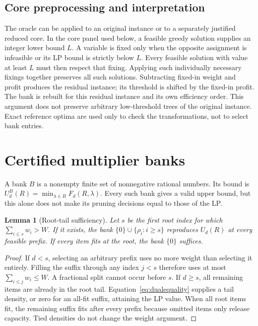 \documentclass[referee,pdflatex,sn-mathphys-num]{sn-jnl}
\theoremstyle{thmstyleone}
\newtheorem{lemma}[theorem]{Lemma}
\theoremstyle{thmstyletwo}
\begin{document}
\subsection{Core preprocessing and interpretation}
The oracle can be applied to an original instance or to a separately justified reduced core. In the core panel used below, a feasible greedy solution supplies an integer lower bound $L$. A variable is fixed only when the opposite assignment is infeasible or its LP bound is strictly below $L$. Every feasible solution with value at least $L$ must then respect that fixing. Applying such individually necessary fixings together preserves all such solutions. Subtracting fixed-in weight and profit produces the residual instance; its threshold is shifted by the fixed-in profit. The bank is rebuilt for this residual instance and its own efficiency order. This argument does not preserve arbitrary low-threshold trees of the original instance. Exact reference optima are used only to check the transformations, not to select bank entries.

\section{Certified multiplier banks}\label{sec:bank}
A bank $B$ is a nonempty finite set of nonnegative rational numbers. Its bound is $U^B_d(R)=\min_{\lambda\in B}F_d(R,\lambda)$. Every such bank gives a valid upper bound, but this alone does not make its pruning decisions equal to those of the LP.

\begin{lemma}[Root-tail sufficiency]\label{lem:tail}
Let $s$ be the first root index for which $\sum_{i\leq s}w_i>W$. If it exists, the bank $\{0\}\cup\{\rho_i:i\geq s\}$ reproduces $U_d(R)$ at every feasible prefix. If every item fits at the root, the bank $\{0\}$ suffices.
\end{lemma}
\begin{proof}
If $d<s$, selecting an arbitrary prefix uses no more weight than selecting it entirely. Filling the suffix through any index $j<s$ therefore uses at most $\sum_{i\leq j}w_i\leq W$. A fractional split cannot occur before $s$. If $d\geq s$, all remaining items are already in the root tail. Equation~\eqref{eq:dualequality} supplies a tail density, or zero for an all-fit suffix, attaining the LP value. When all root items fit, the remaining suffix fits after every prefix because omitted items only release capacity. Tied densities do not change the weight argument.
\end{proof}
\end{document}

